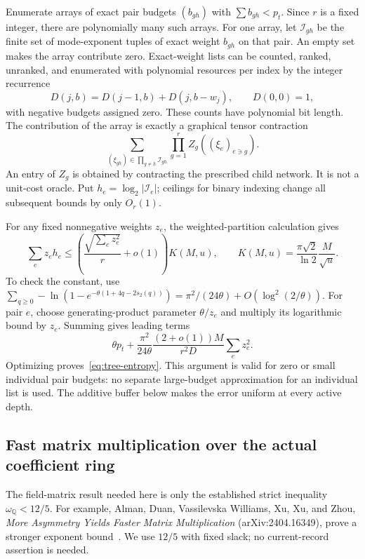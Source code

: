Enumerate arrays of exact pair budgets $(b_{gh})$ with $\sum b_{gh}<p_t$. Since $r$ is a fixed integer, there are polynomially many such arrays. For one array, let $\mathcal I_{gh}$ be the finite set of mode-exponent tuples of exact weight $b_{gh}$ on that pair. An empty set makes the array contribute zero. Exact-weight lists can be counted, ranked, unranked, and enumerated with polynomial resources per index by the integer recurrence
\[
 D(j,b)=D(j-1,b)+D(j,b-w_j),\qquad D(0,0)=1,
\]
with negative budgets assigned zero. These counts have polynomial bit length. The contribution of the array is exactly a graphical tensor contraction
\[
 \sum_{(\xi_{gh})\in\prod_{g\ne h}\mathcal I_{gh}}
                \prod_{g=1}^r Z_g((\xi_e)_{e\ni g}).
\]
An entry of $Z_g$ is obtained by contracting the prescribed child network. It is not a unit-cost oracle. Put $h_e=\log_2|\mathcal I_e|$; ceilings for binary indexing change all subsequent bounds by only $O_r(1)$.

For any fixed nonnegative weights $z_e$, the weighted-partition calculation gives
\begin{equation}\label{eq:tree-entropy}
 \sum_ez_eh_e\le
 \left(\frac{\sqrt{\sum_ez_e^2}}r+o(1)\right)
 K(M,u),\qquad
 K(M,u)=\frac{\pi\sqrt2}{\ln2}\frac M{\sqrt u}.
\end{equation}
To check the constant, use
$\sum_{q\ge0}-\ln(1-e^{-\theta(1+4q-2s_2(q))})
=\pi^2/(24\theta)+O(\log^2(2/\theta))$.
For pair $e$, choose generating-product parameter $\theta/z_e$ and multiply its logarithmic bound by $z_e$. Summing gives leading terms
\[
 \theta p_t+\frac{\pi^2}{24\theta}\frac{(2+o(1))M}{r^2D}
                  \sum_ez_e^2.
\]
Optimizing proves~\eqref{eq:tree-entropy}. This argument is valid for zero or small individual pair budgets: no separate large-budget approximation for an individual list is used. The additive buffer below makes the error uniform at every active depth.

\subsection{Fast matrix multiplication over the actual coefficient ring}
The field-matrix result needed here is only the established strict inequality $\omega_{\mathbb Q}<12/5$. For example, Alman, Duan, Vassilevska Williams, Xu, Xu, and Zhou, \emph{More Asymmetry Yields Faster Matrix Multiplication} (arXiv:2404.16349), prove a stronger exponent bound~\cite{mm2024}. We use $12/5$ with fixed slack; no current-record assertion is needed.

